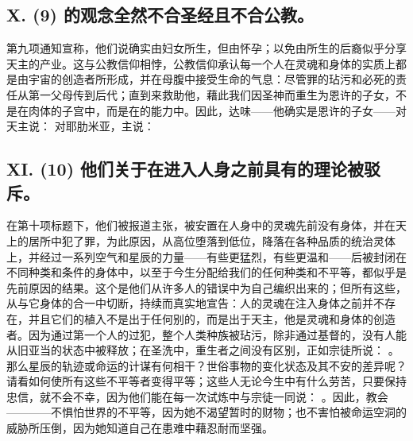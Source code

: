 
\subsection{X. (9) 的观念全然不合圣经且不合公教。}

第九项通知宣称，他们说确实由妇女所生，但由怀孕；以免由所生的后裔似乎分享天主的产业。这与公教信仰相悖，公教信仰承认每一个人在灵魂和身体的实质上都是由宇宙的创造者所形成，并在母腹中接受生命的气息：尽管罪的玷污和必死的责任从第一父母传到后代；直到来救助他，藉此我们因圣神而重生为恩许的子女，不是在肉体的子宫中，而是在的能力中。因此，达味——他确实是恩许的子女——对天主说： 对耶肋米亚，主说： \par


\subsection{XI. (10) 他们关于在进入人身之前具有的理论被驳斥。}

在第十项标题下，他们被报道主张，被安置在人身中的灵魂先前没有身体，并在天上的居所中犯了罪，为此原因，从高位堕落到低位，降落在各种品质的统治灵体上，并经过一系列空气和星辰的力量——有些更猛烈，有些更温和——后被封闭在不同种类和条件的身体中，以至于今生分配给我们的任何种类和不平等，都似乎是先前原因的结果。这个是他们从许多人的错误中为自己编织出来的；但所有这些，从与它身体的合一中切断，持续而真实地宣告：人的灵魂在注入身体之前并不存在，并且它们的植入不是出于任何别的，而是出于天主，他是灵魂和身体的创造者。因为通过第一个人的过犯，整个人类种族被玷污，除非通过基督的，没有人能从旧亚当的状态中被释放；在圣洗中，重生者之间没有区别，正如宗徒所说： 。那么星辰的轨迹或命运的计谋有何相干？世俗事物的变化状态及其不安的差异呢？请看如何使所有这些不平等者变得平等；这些人无论今生中有什么劳苦，只要保持忠信，就不会不幸，因为他们能在每一次试炼中与宗徒一同说： 。因此，教会————不惧怕世界的不平等，因为她不渴望暂时的财物；也不害怕被命运空洞的威胁所压倒，因为她知道自己在患难中藉忍耐而坚强。\par

